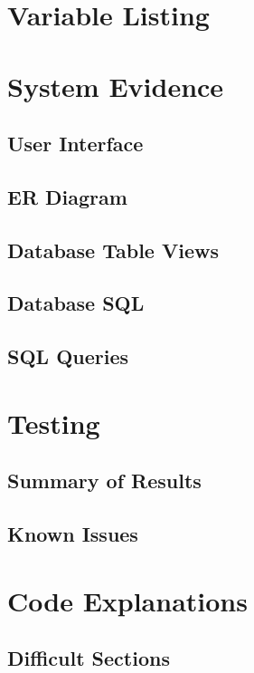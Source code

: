 \section{Variable Listing}

\section{System Evidence}

\subsection{User Interface}

\subsection{ER Diagram}

\subsection{Database Table Views}

\subsection{Database SQL}

\subsection{SQL Queries}

\section{Testing}

\subsection{Summary of Results}

\subsection{Known Issues}

\section{Code Explanations}

\subsection{Difficult Sections}

